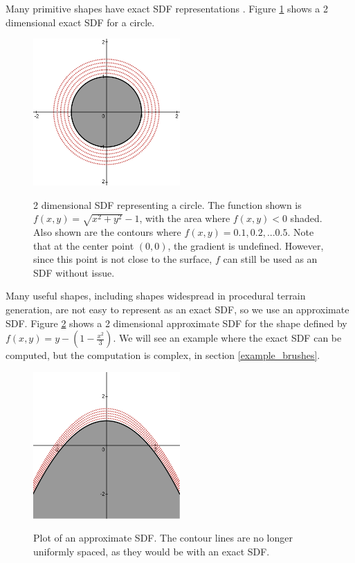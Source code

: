 \documentclass[11pt]{article}
\begin{document}
Many primitive shapes have exact SDF representations \cite{quilez:sdf}. Figure \ref{fig:Circle_SDF} shows a 2 dimensional exact SDF for a circle.

\begin{figure}
\caption{2 dimensional SDF representing a circle. The function shown is $f\left(x,y\right) = \sqrt{x^2+y^2}-1$, with the area where $f\left(x,y\right) < 0 $ shaded. Also shown are the contours where $f\left(x,y\right) = 0.1,0.2,...0.5$. Note that at the center point $\left(0,0\right)$, the gradient is undefined. However, since this point is not close to the surface, $f$ can still be used as an SDF without issue.}
\includegraphics[width=0.5\textwidth]{Circle_SDF}
\label{fig:Circle_SDF}
\end{figure}

Many useful shapes, including shapes widespread in procedural terrain generation, are not easy to represent as an exact SDF, so we use an approximate SDF. Figure \ref{fig:Hill_SDF} shows a 2 dimensional approximate SDF for the shape defined by $f\left(x,y\right)=y-\left(1-\frac{x^2}{3}\right)$. We will see an example where the exact SDF can be computed, but the computation is complex, in section \ref{example_brushes}.

\begin{figure}
\caption{Plot of an approximate SDF. The contour lines are no longer uniformly spaced, as they would be with an exact SDF.}
\includegraphics[width=0.5\textwidth]{Hill_SDF}
\label{fig:Hill_SDF}
\end{figure}
\end{document}
